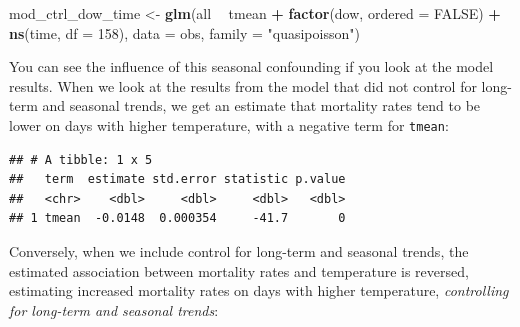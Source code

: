 \documentclass[
]{book}
\newenvironment{Shaded}{\begin{snugshade}}{\end{snugshade}}
\newcommand{\DataTypeTok}[1]{\textcolor[rgb]{0.13,0.29,0.53}{#1}}
\newcommand{\DecValTok}[1]{\textcolor[rgb]{0.00,0.00,0.81}{#1}}
\newcommand{\KeywordTok}[1]{\textcolor[rgb]{0.13,0.29,0.53}{\textbf{#1}}}
\newcommand{\NormalTok}[1]{#1}
\newcommand{\OperatorTok}[1]{\textcolor[rgb]{0.81,0.36,0.00}{\textbf{#1}}}
\newcommand{\OtherTok}[1]{\textcolor[rgb]{0.56,0.35,0.01}{#1}}
\newcommand{\StringTok}[1]{\textcolor[rgb]{0.31,0.60,0.02}{#1}}
\begin{document}
\begin{Shaded}
\begin{Highlighting}[]
\NormalTok{mod_ctrl_dow_time <-}\StringTok{ }\KeywordTok{glm}\NormalTok{(all }\OperatorTok{~}\StringTok{ }\NormalTok{tmean }\OperatorTok{+}\StringTok{ }\KeywordTok{factor}\NormalTok{(dow, }\DataTypeTok{ordered =} \OtherTok{FALSE}\NormalTok{) }\OperatorTok{+}
\StringTok{                           }\KeywordTok{ns}\NormalTok{(time, }\DataTypeTok{df =} \DecValTok{158}\NormalTok{), }
                         \DataTypeTok{data =}\NormalTok{ obs, }\DataTypeTok{family =} \StringTok{"quasipoisson"}\NormalTok{)}
\end{Highlighting}
\end{Shaded}

You can see the influence of this seasonal confounding if you look at the model
results. When we look at the results from the model that did not control for
long-term and seasonal trends, we get an estimate that mortality rates tend to
be lower on days with higher temperature, with a negative term for \texttt{tmean}:

\begin{Shaded}
\end{Shaded}

\begin{verbatim}
## # A tibble: 1 x 5
##   term  estimate std.error statistic p.value
##   <chr>    <dbl>     <dbl>     <dbl>   <dbl>
## 1 tmean  -0.0148  0.000354     -41.7       0
\end{verbatim}

Conversely, when we include control for long-term and seasonal trends, the
estimated association between mortality rates and temperature is reversed,
estimating increased mortality rates on days with higher temperature, \emph{controlling
for long-term and seasonal trends}:

\begin{Shaded}
\end{Shaded}
\end{document}
